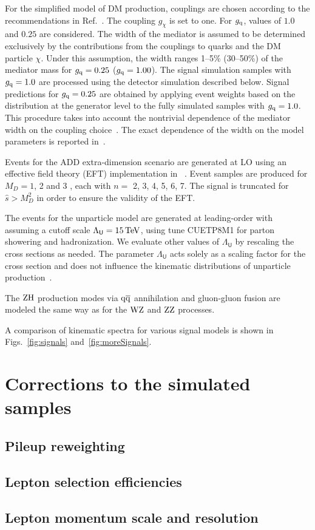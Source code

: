 For the simplified model of DM production, couplings are chosen according to the recommendations in Ref.~\cite{Boveia:2016mrp}.
The coupling $g_{\chi}$ is set to one. For $g_{\mathrm{q}}$, values of $1.0$ and $0.25$ are considered. The width of the mediator is assumed to be determined exclusively by the contributions from the couplings to quarks and the DM particle $\chi$. Under this assumption, the width ranges 1--5\% (30--50\%) of the mediator mass for $g_{\mathrm{q}}=0.25$ ($g_{\mathrm{q}}=1.00$).
The signal simulation samples with $g_{\mathrm{q}}=1.0$ are processed using the detector simulation described below.
Signal predictions for $g_{\mathrm{q}}=0.25$ are obtained by applying event weights based on the \ETm distribution at the generator level to the fully simulated samples with $g_{\mathrm{q}}=1.0$.
This procedure takes into account the nontrivial dependence of the mediator width on the coupling choice~\cite{Boveia:2016mrp}.  The exact dependence of the width on the model parameters is reported in~\cite{Boveia:2016mrp}.

Events for the ADD extra-dimension scenario are generated at LO using an effective field theory (EFT) implementation in ~\cite{Ask:2008fh,Ask:2009pv}. Event samples are produced for $M_{D} = 1$, 2 and 3 \TeV, each with $n =$ 2, 3, 4, 5, 6, 7.
The signal is truncated for $\hat{s} > M_{D}^2$ in order to ensure the validity of the EFT.

The events for the unparticle model are generated at leading-order with ~\cite{Ask:2008fh,Ask:2009pv}
assuming a cutoff scale $\Lambda_{\textsf{U}}=15\,\text{Te\hspace{-.08em}V}$, 
using tune CUETP8M1 for parton showering and hadronization. 
We evaluate other values of $\Lambda_{\textsf{U}}$ by rescaling the cross sections as needed.
The parameter $\Lambda_{\textsf{U}}$ acts solely as a scaling factor
for the cross section and does not influence the kinematic distributions of unparticle production~\cite{Ask:2009pv}.

The $\mbox{Z}\mathrm{H}$ production modes via $\mathrm{q}\mathrm{\overline{q}}$ annihilation and gluon-gluon fusion are modeled the same way as for the $\mbox{W}\mbox{Z}$ and $\mbox{Z}\mbox{Z}$ processes.

A comparison of kinematic spectra for various signal models is shown in Figs.~\ref{fig:signals} and~\ref{fig:moreSignals}.

\section{Corrections to the simulated samples}
\subsection{Pileup reweighting}
\subsection{Lepton selection efficiencies}
\subsection{Lepton momentum scale and resolution}

